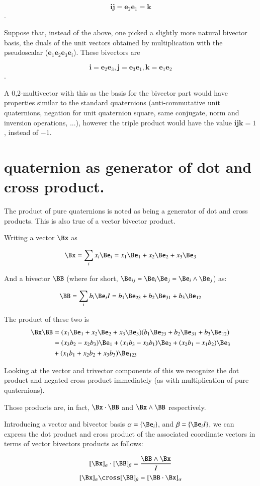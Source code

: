 \[
\mathbf{i}\mathbf{j} = \mathbf{e}_2\mathbf{e}_1 = \mathbf{k}
\].

Suppose that, instead of the above, one picked a slightly more natural bivector basis, the duals of the unit vectors obtained by multiplication with the pseudoscalar ($\mathbf{e}_1\mathbf{e}_2\mathbf{e}_3\mathbf{e}_i$).  These bivectors are

\[
\mathbf{i}=\mathbf{e}_2\mathbf{e}_3, \mathbf{j}=\mathbf{e}_3\mathbf{e}_1, \mathbf{k}=\mathbf{e}_1\mathbf{e}_2
\].

A 0,2-multivector with this as the basis for the bivector part would have properties similar to the standard quaternions (anti-commutative unit quaternions, negation for unit quaternion square, same conjugate, norm and inversion operations, ...), however the triple product would have the value $\mathbf{i}\mathbf{j}\mathbf{k} = 1$, instead of $-1$.

\section{quaternion as generator of dot and cross product. }

The product of pure quaternions is noted as being a generator of dot and cross products.  This is also true
of a vector bivector product.

Writing a vector $\Bx$ as

\[
\Bx = \sum_i x_i \Be_i = x_1 \Be_1 + x_2 \Be_2 + x_3 \Be_3
\]

And a bivector $\BB$ (where for short, $\Be_{ij} = \Be_i \Be_j = \Be_i \wedge \Be_j$) as:

\[
\BB = \sum_i b_i \Be_i I = b_1 \Be_{23} + b_2 \Be_{31} + b_3 \Be_{12}
\]

The product of these two is
\begin{align*}
\Bx \BB 
&= (x_1 \Be_1 + x_2 \Be_2 + x_3 \Be_3)(b_1 \Be_{23} + b_2 \Be_{31} + b_3 \Be_{12}) \\
&= (x_3 b_2 - x_2 b_3) \Be_1 + (x_1 b_3 - x_3 b_1) \Be_2 + (x_2 b_1 - x_1 b_2) \Be_3 \\
&+ (x_1 b_1 + x_2 b_2 + x_3 b_3) \Be_{123} \\
\end{align*}

Looking at the vector and trivector components of this we recognize the dot product and negated cross product
immediately (as with multiplication of pure quaternions).

Those products are, in fact, $\Bx \cdot \BB$ and $\Bx \wedge \BB$ respectively.

Introducing a vector and bivector basis $\alpha = \{ \Be_i \}$, and $\beta = \{ \Be_i I \}$, we can
express the dot product and cross product of the associated coordinate vectors
in terms of vector bivectors products as follows:

\[
[\Bx]_\alpha \cdot [\BB]_\beta = \frac{\BB \wedge \Bx}{I}
\]
\[
[\Bx]_\alpha \cross [\BB]_\beta = [\BB \cdot \Bx]_\alpha
\]

